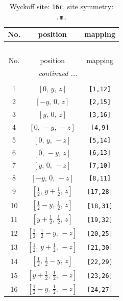\documentclass[fleqn,8pt]{jsarticle}
\begin{document}
\renewcommand{\arraystretch}{1.2}
\begin{longtable}{ccc}
\caption{Wyckoff site: {\tt 16r}, site symmetry: {\tt .m.}}
 \\
 \hline \hline
No. & position & mapping \\ \hline \endfirsthead

\multicolumn{2}{l}{\tablename\ \thetable{}} \\
 \hline \hline
No. & position & mapping \\ \hline \endhead

 \hline \hline
\multicolumn{2}{r}{\footnotesize\it continued ...} \\ \endfoot

 \hline \hline
\multicolumn{2}{r}{} \\ \endlastfoot

1 & $\left[ 0,\, y,\, z \right]$ & {\tt [1,12]} \\ \hline
2 & $\left[ - y,\, 0,\, z \right]$ & {\tt [2,15]} \\ \hline
3 & $\left[ y,\, 0,\, z \right]$ & {\tt [3,16]} \\ \hline
4 & $\left[ 0,\, - y,\, - z \right]$ & {\tt [4,9]} \\ \hline
5 & $\left[ 0,\, y,\, - z \right]$ & {\tt [5,14]} \\ \hline
6 & $\left[ 0,\, - y,\, z \right]$ & {\tt [6,13]} \\ \hline
7 & $\left[ y,\, 0,\, - z \right]$ & {\tt [7,10]} \\ \hline
8 & $\left[ - y,\, 0,\, - z \right]$ & {\tt [8,11]} \\ \hline
9 & $\left[ \frac{1}{2},\, y + \frac{1}{2},\, z \right]$ & {\tt [17,28]} \\ \hline
10 & $\left[ \frac{1}{2} - y,\, \frac{1}{2},\, z \right]$ & {\tt [18,31]} \\ \hline
11 & $\left[ y + \frac{1}{2},\, \frac{1}{2},\, z \right]$ & {\tt [19,32]} \\ \hline
12 & $\left[ \frac{1}{2},\, \frac{1}{2} - y,\, - z \right]$ & {\tt [20,25]} \\ \hline
13 & $\left[ \frac{1}{2},\, y + \frac{1}{2},\, - z \right]$ & {\tt [21,30]} \\ \hline
14 & $\left[ \frac{1}{2},\, \frac{1}{2} - y,\, z \right]$ & {\tt [22,29]} \\ \hline
15 & $\left[ y + \frac{1}{2},\, \frac{1}{2},\, - z \right]$ & {\tt [23,26]} \\ \hline
16 & $\left[ \frac{1}{2} - y,\, \frac{1}{2},\, - z \right]$ & {\tt [24,27]} \\
\end{longtable}
\end{document}
